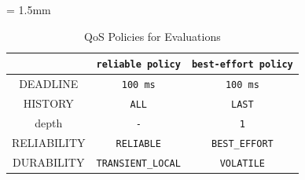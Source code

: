 \documentclass{sig-alternate-05-2015}
\begin{document}
\renewcommand{\arraystretch}{1.0}
\begin{table}[t]
  \caption{\label{tab:orgtable2}
    QoS Policies for Evaluations}
  \centering
  \tabcolsep = 1.5mm              %
  \begin{tabular}{c|cc}
    \hline
    & \textbf{\texttt{reliable policy}} & \textbf{\texttt{best-effort policy}}\\
    \hline
    \hline
    DEADLINE & \texttt{100 ms} & \texttt{100 ms}\\
    HISTORY & \texttt{ALL} & \texttt{LAST}\\
    depth & \texttt{-} & \texttt{1}\\
    RELIABILITY & \texttt{RELIABLE} & \texttt{BEST\_EFFORT}\\
    DURABILITY & \texttt{TRANSIENT\_LOCAL} & \texttt{VOLATILE}\\
    \hline
  \end{tabular}
  \vspace{-5mm}
\end{table}

\newcommand*{\x}[0]{\checkmark} %
\newcommand*{\y}[1]{$\blacktriangle^{#1}$} %
\newcommand*{\z}[1]{$\triangle^{#1}$} %
\end{document}

